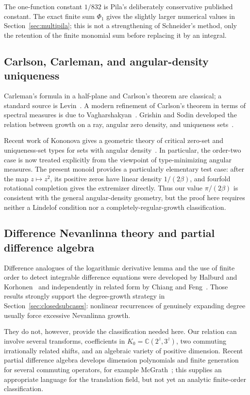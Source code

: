 \documentclass[11pt,oneside]{article}
\theoremstyle{definition}
\theoremstyle{remark}
\newcommand{\C}{\mathbb C}
\begin{document}
The one-function constant $1/832$ is Pila's deliberately conservative published constant.
The exact finite sum $\Phi_1$ gives the slightly larger numerical values in
Section~\ref{sec:multipila}; this is not a strengthening of Schneider's method, only the
retention of the finite monomial sum before replacing it by an integral.

\subsection{Carlson, Carleman, and angular-density uniqueness}

Carleman's formula in a half-plane and Carlson's theorem are classical; a standard source
is Levin~\cite{Levin1980}.  A modern refinement of Carlson's theorem in terms of spectral
measures is due to Vagharshakyan~\cite{Vagharshakyan2021}.  Grishin and Sodin developed the
relation between growth on a ray, angular zero density, and uniqueness
sets~\cite{GrishinSodin1990}.

Recent work of Kononova gives a geometric theory of critical zero-set and uniqueness-set
types for sets with angular density~\cite{KononovaI,KononovaII,KononovaIII}.  In particular,
the order-two case is now treated explicitly from the viewpoint of type-minimizing angular
measures.  The present monoid provides a particularly elementary test case: after the map
$z\mapsto z^2$, its positive zeros have linear density $1/(2\beta)$, and fourfold rotational
completion gives the extremizer directly.  Thus our value $\pi/(2\beta)$ is consistent with
the general angular-density geometry, but the proof here requires neither a Lindelof
condition nor a completely-regular-growth classification.

\subsection{Difference Nevanlinna theory and partial difference algebra}

Difference analogues of the logarithmic derivative lemma and the use of finite order to
detect integrable difference equations were developed by Halburd and
Korhonen~\cite{HalburdKorhonen2006,HalburdKorhonen2007} and independently in related form by
Chiang and Feng~\cite{ChiangFeng2008}.  Those results strongly support the degree-growth
strategy in Section~\ref{sec:closedsubcases}: nonlinear recurrences of genuinely expanding
degree usually force excessive Nevanlinna growth.

They do not, however, provide the classification needed here.  Our relation can involve
several transforms, coefficients in $K_0=\C(2^z,3^z)$, two commuting irrationally related
shifts, and an algebraic variety of positive dimension.  Recent partial difference algebra
develops dimension polynomials and finite generation for several commuting operators, for
example McGrath~\cite{McGrath2025}; this supplies an appropriate language for the translation
field, but not yet an analytic finite-order classification.
\end{document}
